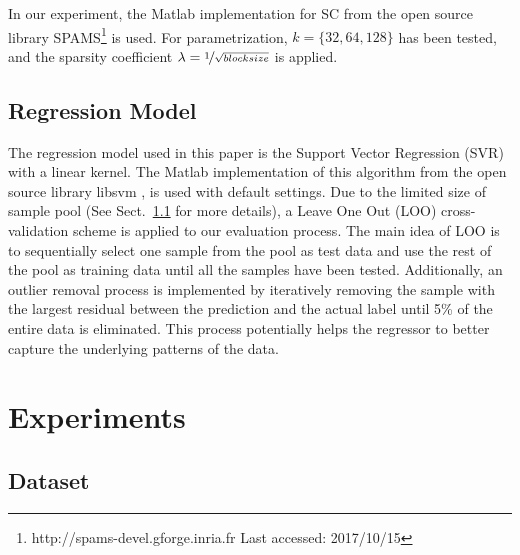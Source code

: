 \documentclass[conference]{IEEEtran}
\begin{document}
In our experiment, the Matlab implementation for SC from the open source library SPAMS\footnote{http://spams-devel.gforge.inria.fr Last accessed: 2017/10/15}\cite{Mairal2009a} is used. For parametrization, $k = \{32, 64, 128\}$ has been tested, and the sparsity coefficient $\lambda = \nicefrac{1}{\sqrt{block size}}$ is applied. 

\subsection{Regression Model}
The regression model used in this paper is the Support Vector Regression (SVR) with a linear kernel. The Matlab implementation of this algorithm from the  open source library  libsvm \cite{Chang2011}, is used with default settings. Due to the limited size of sample pool (See Sect.~\ref{subsec:dataset} for more details), a Leave One Out (LOO) cross-validation scheme is applied to our evaluation process. The main idea of LOO is to sequentially select one sample from the pool as test data and use the rest of the pool as training data until all the samples have been tested. Additionally, an outlier removal process is implemented by iteratively removing the sample with the largest residual between the prediction and the actual label until 5\% of the entire data is eliminated. This process potentially helps the regressor to better capture the underlying patterns of the data.  

\section{Experiments}\label{sec:experiments}
\subsection{Dataset}\label{subsec:dataset}
\end{document}
